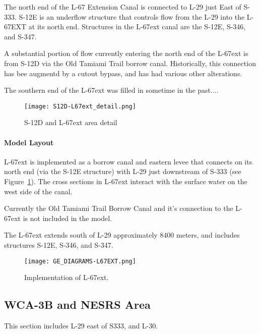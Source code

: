 The north end of the L-67 Extension Canal is connected to L-29 just East of S-333. S-12E is an underflow structure that controls flow from the L-29 into the L-67EXT at its north end. Structures in the L-67ext canal are the S-12E, S-346, and S-347.

A substantial portion of flow currently entering the north end of the L-67ext is from S-12D via the Old Tamiami Trail borrow canal. Historically, this connection has bee augmentd by a cutout bypass, and has had various other alterations.

The southern end of the L-67ext was filled in sometime in the past....

\begin{figure}[!h]
  \begin{center}
  \texttt{[image: S12D-L67ext\_detail.png]}
  \caption{S-12D and L-67ext area detail}
  \end{center}
\end{figure}


\paragraph{Model Layout}

L-67ext is implemented as a borrow canal and eastern levee that connects on its north end (via the S-12E structure) with L-29 just downstream of S-333 (see Figure~\ref{fig:H_L-67-EXT}). The cross sections in L-67ext interact with the surface water on the west side of the canal.

Currently the Old Tamiami Trail Borrow Canal and it's connection to the L-67ext is not included in the model.

The L-67ext extends south of L-29 approximately 8400 meters, and includes structures S-12E, S-346, and S-347.

\begin{figure}[!ht]
\begin{center}
  \texttt{[image: GE\_DIAGRAMS-L67EXT.png]}
  \caption[Implementation of L-67ext]{Implementation of L-67ext.}
\label{fig:H_L-67-EXT}
\end{center}
\end{figure}


\clearpage

\subsection{WCA-3B and NESRS Area}
This section includes L-29 east of S333, and L-30.


